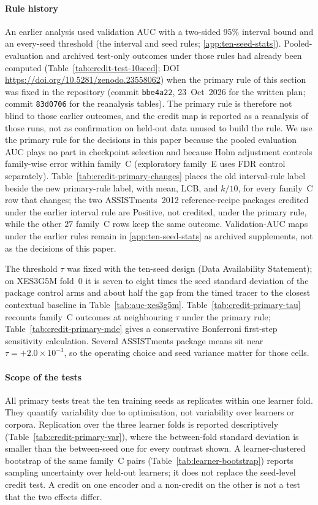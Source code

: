 \paragraph{Rule history}
An earlier analysis used validation AUC with a two-sided 95\% interval
bound and an every-seed threshold (the interval and seed rules;
\ref{app:ten-seed-stats}). Pooled-evaluation and archived test-only
outcomes under those rules had already been computed
(Table~\ref{tab:credit-test-10seed};
DOI \url{https://doi.org/10.5281/zenodo.23558062}) when the primary rule
of this section was fixed in the repository (commit \texttt{bbe4a22},
23~Oct~2026 for the written plan; commit \texttt{83d0706} for the
reanalysis tables). The primary rule is therefore not blind to those
earlier outcomes, and the credit map is reported as a reanalysis of
those runs, not as confirmation on held-out data unused to build the
rule. We use the primary rule for the decisions in this paper because
the pooled evaluation AUC plays no part in checkpoint selection and
because Holm adjustment controls family-wise error within family~C
(exploratory family~E uses FDR control separately).
Table~\ref{tab:credit-primary-changes} places the old interval-rule
label beside the new primary-rule label, with mean, LCB, and $k/10$,
for every family~C row that changes; the two ASSISTments~2012
reference-recipe packages credited under the earlier interval rule are
Positive, not credited, under the primary rule, while the other $27$
family~C rows keep the same outcome. Validation-AUC maps under the
earlier rules remain in \ref{app:ten-seed-stats} as archived
supplements, not as the decisions of this paper.

The threshold $\tau$ was fixed with the ten-seed design (Data
Availability Statement); on XES3G5M fold~0 it is seven to eight times
the seed standard deviation of the package control arms and about half
the gap from the timed tracer to the closest contextual baseline in
Table~\ref{tab:auc-xes3g5m}. Table~\ref{tab:credit-primary-tau}
recounts family~C outcomes at neighbouring $\tau$ under the primary
rule; Table~\ref{tab:credit-primary-mde} gives a conservative
Bonferroni first-step sensitivity calculation. Several ASSISTments
package means sit near $\tau{=}{+}2.0\times 10^{-3}$, so the operating
choice and seed variance matter for those cells.

\paragraph{Scope of the tests}
All primary tests treat the ten training seeds as replicates within one
learner fold. They quantify variability due to optimisation, not
variability over learners or corpora. Replication over the three
learner folds is reported descriptively
(Table~\ref{tab:credit-primary-var}), where the between-fold standard
deviation is smaller than the between-seed one for every contrast shown.
A learner-clustered bootstrap of the same family~C pairs
(Table~\ref{tab:learner-bootstrap}) reports sampling uncertainty over
held-out learners; it does not replace the seed-level credit test.
A credit on one encoder and a non-credit on the other is not a test
that the two effects differ.

